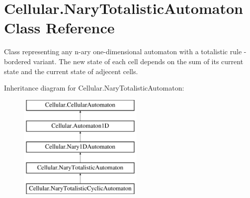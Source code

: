 \hypertarget{class_cellular_1_1_nary_totalistic_automaton}{}\section{Cellular.\+Nary\+Totalistic\+Automaton Class Reference}
\label{class_cellular_1_1_nary_totalistic_automaton}


Class representing any n-\/ary one-\/dimensional automaton with a totalistic rule -\/ bordered variant. The new state of each cell depends on the sum of its current state and the current state of adjecent cells.  


Inheritance diagram for Cellular.\+Nary\+Totalistic\+Automaton\+:\begin{figure}[H]
\begin{center}
\leavevmode
\includegraphics[height=5.000000cm]{class_cellular_1_1_nary_totalistic_automaton}
\end{center}
\end{figure}
